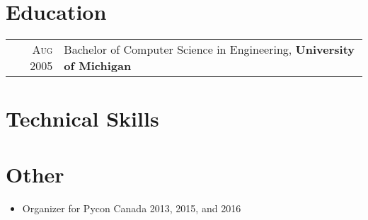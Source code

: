 \documentclass[a4paper,10pt]{article}
\begin{document}
    
        \section{Education}
        \begin{tabular}{rl}
        \textsc{Aug} 2005 & Bachelor of Computer Science in Engineering, \textbf{University of Michigan}\\
        \end{tabular}
    

    
        \section{Technical Skills}
               \newline{}     \newline{}   \newline

    
    \section {Other}
    \begin{itemize}
        \item Organizer for Pycon Canada 2013, 2015, and 2016
    \end{itemize}
    
\end{document}
